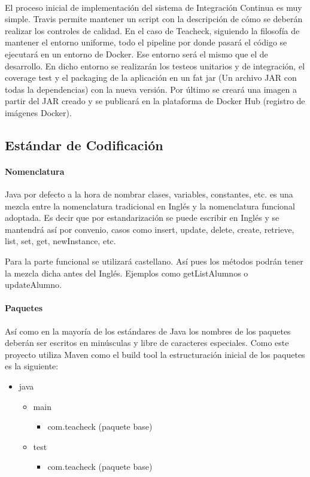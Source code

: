 \paragraph{}
El proceso inicial de implementación del sistema de Integración Continua es muy simple. Travis permite mantener un script con la descripción de cómo se deberán realizar los controles de calidad. En el caso de Teacheck, siguiendo la filosofía de mantener el entorno uniforme, todo el pipeline por donde pasará el código se ejecutará en un entorno de Docker. Ese entorno será el mismo que el de desarrollo. En dicho entorno se realizarán los testeos unitarios y de integración, el coverage test y el packaging de la aplicación en un fat jar (Un archivo JAR con todas la dependencias) con la nueva versión. Por último se creará una imagen a partir del JAR creado y se publicará en la plataforma de Docker Hub (registro de imágenes Docker). 

\subsection{Estándar de Codificación}
\paragraph{Nomenclatura}
Java por defecto a la hora de nombrar clases, variables, constantes, etc. es una mezcla entre la nomenclatura tradicional en Inglés y la nomenclatura funcional adoptada. Es decir que por estandarización se puede escribir en Inglés y se mantendrá así por convenio, casos como insert, update, delete, create, retrieve, list, set, get, newInstance, etc.

Para la parte funcional se utilizará castellano. Así pues los métodos podrán tener la mezcla dicha antes del Inglés. Ejemplos como getListAlumnos o updateAlumno.
\paragraph{Paquetes}
Así como en la mayoría de los estándares de Java los nombres de los paquetes deberán ser escritos en minúsculas y libre de caracteres especiales. Como este proyecto utiliza Maven como el build tool la estructuración inicial de los paquetes es la siguiente:

\begin{itemize}
\item
  java
  \begin{itemize}
  \item
    main
    \begin{itemize}      
    \item
      com.teacheck (paquete base)
    \end{itemize}
  \item
   test
   \begin{itemize}     
   \item     
     com.teacheck (paquete base)     
   \end{itemize}
  \end{itemize}
\end{itemize}

